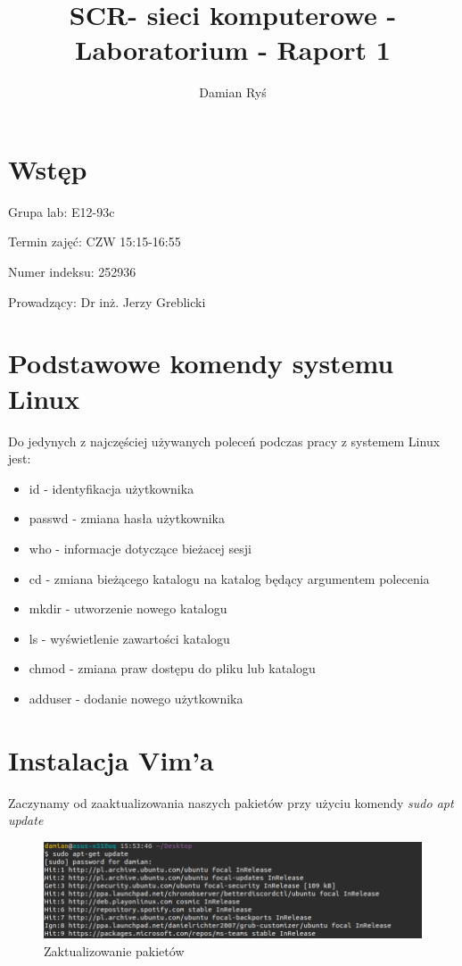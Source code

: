 \documentclass{article}
\title{SCR- sieci komputerowe - Laboratorium - Raport 1}
\author{Damian Ryś}
\begin{document}
\maketitle


\tableofcontents
\section{Wstęp}
\hspace*{0.5cm}Grupa lab: E12-93c

Termin zajęć: CZW 15:15-16:55

Numer indeksu: 252936

Prowadzący: Dr inż. Jerzy Greblicki 
\section{Podstawowe komendy systemu Linux}
Do jedynych z najczęściej używanych poleceń podczas pracy z systemem Linux jest:
\begin{itemize}
    \item id - identyfikacja użytkownika
    \item passwd - zmiana hasła użytkownika
    \item who - informacje dotyczące bieżacej sesji
    \item cd - zmiana bieżącego katalogu na katalog będący argumentem polecenia
    \item mkdir - utworzenie nowego katalogu
    \item ls - wyświetlenie zawartości katalogu
    \item chmod - zmiana praw dostępu do pliku lub katalogu
    \item adduser - dodanie nowego użytkownika
\end{itemize}

\section{Instalacja Vim'a}
Zaczynamy od zaaktualizowania naszych pakietów przy użyciu
komendy \textit{sudo apt update}

\begin{figure}[H]
    \centering
    \includegraphics[totalheight=3cm]{data/sudoUpdate.png}
    \caption{Zaktualizowanie pakietów }
    \label{2}
\end{figure}
\end{document}
